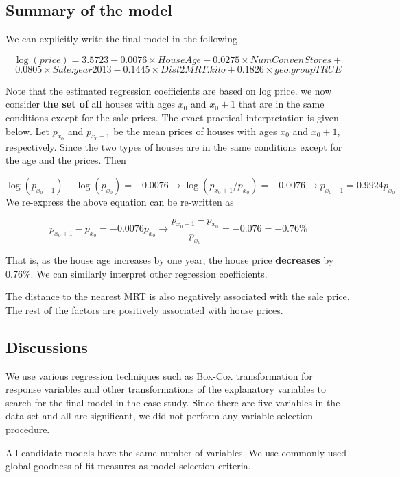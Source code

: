 \documentclass[
]{book}
\begin{document}
\hypertarget{summary-of-the-model}{%
\subsection{Summary of the model}\label{summary-of-the-model}}

We can explicitly write the final model in the following

\[
\log(price) =3.5723 - 0.0076\times HouseAge +0.0275\times NumConvenStores + \]\[   0.0805\times Sale.year2013 - 0.1445\times Dist2MRT.kilo + 0.1826\times geo.groupTRUE
\]

Note that the estimated regression coefficients are based on log price. we now consider \textbf{the set of} all houses with ages \(x_0\) and \(x_0 + 1\) that are in the same conditions except for the sale prices. The exact practical interpretation is given below. Let \(p_{x_0}\) and \(p_{x_0+1}\) be the mean prices of houses with ages \(x_0\) and \(x_0 + 1\), respectively. Since the two types of houses are in the same conditions except for the age and the prices. Then

\[
\log (p_{x_0+1}) - \log(p_{x_0}) = -0.0076  \to \log(p_{x_0+1}/p_{x_0}) = -0.0076 \to p_{x_0+1} = 0.9924p_{x_0}
\]
We re-express the above equation can be re-written as

\[
p_{x_0+1} - p_{x_0} = -0.0076p_{x_0} \to \frac{p_{x_0+1}-p_{x_0}}{p_{x_0}} = -0.076 = -0.76\%
\]

That is, as the house age increases by one year, the house price \textbf{decreases} by 0.76\%. We can similarly interpret other regression coefficients.

The distance to the nearest MRT is also negatively associated with the sale price. The rest of the factors are positively associated with house prices.

\hypertarget{discussions}{%
\subsection{Discussions}\label{discussions}}

We use various regression techniques such as Box-Cox transformation for response variables and other transformations of the explanatory variables to search for the final model in the case study. Since there are five variables in the data set and all are significant, we did not perform any variable selection procedure.

All candidate models have the same number of variables. We use commonly-used global goodness-of-fit measures as model selection criteria.
\end{document}
